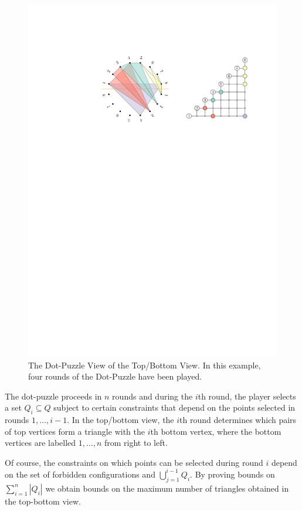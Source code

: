 \documentclass{patmorin}
\begin{document}
\begin{figure}
   \begin{center}
      \includegraphics{figs/point-view}
   \end{center}
   \caption{The Dot-Puzzle View of the Top/Bottom View. In this example,
     four rounds of the Dot-Puzzle have been played.}
\end{figure}

The dot-puzzle proceeds in $n$ rounds and during the $i$th round, the
player selects a set $Q_i\subseteq Q$ subject to certain constraints
that depend on the points selected in rounds $1,\ldots,i-1$.  In the
top/bottom view, the $i$th round determines which pairs of top vertices
form a triangle with the $i$th bottom vertex, where the bottom
vertices are labelled $1,\ldots,n$ from right to left.  

Of course, the constraints on which points can be selected during round
$i$ depend on the set of forbidden configurations and $\bigcup_{j=1}^{i-1}
Q_i$.  By proving bounds on $\sum_{i=1}^n |Q_i|$ we obtain bounds on
the maximum number of triangles obtained in the top-bottom view.
\end{document}

